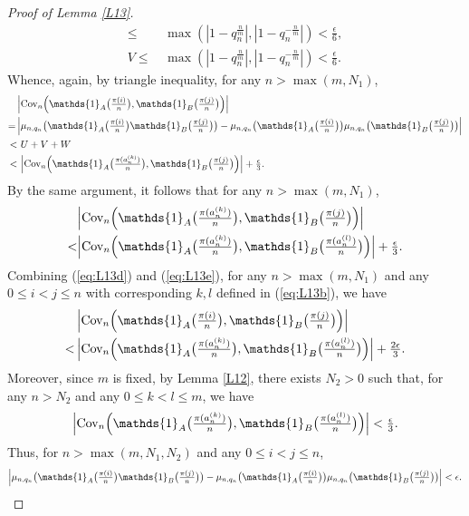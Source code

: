 \begin{proof}[Proof of Lemma \ref{L13}]
\begin{align*}
 \le&\, \textstyle\max{\left(\left|1-q_n^{\frac{n}{m}}\right|, \left|1-q_n^{-\frac{n}{m}}\right|\right)} < \textstyle\frac{\epsilon}{6},\\
  \textstyle V \le&\, \textstyle\max{\left(\left|1-q_n^{\frac{n}{m}}\right|, \left|1-q_n^{-\frac{n}{m}}\right|\right)} < \frac{\epsilon}{6}.
\end{align*}
Whence, again, by triangle inequality, for any $n > \max{(m, N_1)}$,
\begin{align}
  &\textstyle\Big|\cov_n\Big(\mathds{1}_A\big(\frac{\pi(i)}{n}\big), \mathds{1}_B\big(\frac{\pi(j)}{n}\big)\Big)\Big| \label{eq:L13d}\\
  =\,&\textstyle\Big| \n \big(\mathds{1}_A\big(\frac{\pi(i)}{n}\big)\mathds{1}_B\big(\frac{\pi(j)}{n}\big)\big) -
     \n \big(\mathds{1}_A\big(\frac{\pi(i)}{n}\big)\big) \n \big(\mathds{1}_B\big(\frac{\pi(j)}{n}\big)\big)\Big| \nonumber\\
  <&\ \textstyle U + V + W \nonumber\\
  <&\ \textstyle \Big|\cov_n\Big(\mathds{1}_A\big(\frac{\pi(a_n^{(k)})}{n}\big), \mathds{1}_B\big(\frac{\pi(j)}{n}\big)\Big)\Big| + \frac{\epsilon}{3}.  \nonumber
\end{align}
By the same argument, it follows that for any $n > \max{(m, N_1)}$,
\begin{align}
  &\textstyle\Big|\cov_n\Big(\mathds{1}_A\big(\frac{\pi(a_n^{(k)})}{n}\big), \mathds{1}_B\big(\frac{\pi(j)}{n}\big)\Big)\Big| \label{eq:L13e}\\
  <&\textstyle\Big| \cov_n \Big(\mathds{1}_A\big(\frac{\pi(a_n^{(k)})}{n}\big), \mathds{1}_B\big(\frac{\pi(a_n^{(l)})}{n}\big)\Big) \Big| +\frac{\epsilon}{3}. \nonumber
\end{align}
Combining (\ref{eq:L13d}) and (\ref{eq:L13e}), for any $n > \max{(m, N_1)}$ and any $0 \le i < j \le n$ with
corresponding $k, l$ defined in (\ref{eq:L13b}), we have
\begin{align*}
  &\textstyle\Big|\cov_n\Big(\mathds{1}_A\big(\frac{\pi(i)}{n}\big), \mathds{1}_B\big(\frac{\pi(j)}{n}\big)\Big)\Big|\\
  <\,&\textstyle\Big| \cov_n \Big(\mathds{1}_A\big(\frac{\pi(a_n^{(k)})}{n}\big), \mathds{1}_B\big(\frac{\pi(a_n^{(l)})}{n}\big)\Big) \Big| +\frac{2\epsilon}{3}.
\end{align*}
Moreover, since $m$ is fixed, by Lemma \ref{L12}, there exists $N_2 >0$ such that, for any $n > N_2$ and any $0 \le k < l \le m$, we have
\[
\textstyle\Big| \cov_n \Big(\mathds{1}_A\big(\frac{\pi(a_n^{(k)})}{n}\big), \mathds{1}_B\big(\frac{\pi(a_n^{(l)})}{n}\big)\Big) \Big| < \frac{\epsilon}{3}.
\]
Thus, for $n > \max{(m, N_1, N_2)}$ and any $0 \le i < j \le n$,
\[
\textstyle\Big| \n \big(\mathds{1}_A\big(\frac{\pi(i)}{n}\big)\mathds{1}_B\big(\frac{\pi(j)}{n}\big)\big) -
     \n \big(\mathds{1}_A\big(\frac{\pi(i)}{n}\big)\big) \n \big(\mathds{1}_B\big(\frac{\pi(j)}{n}\big)\big)\Big|
     < \epsilon.
\]
\end{proof}


